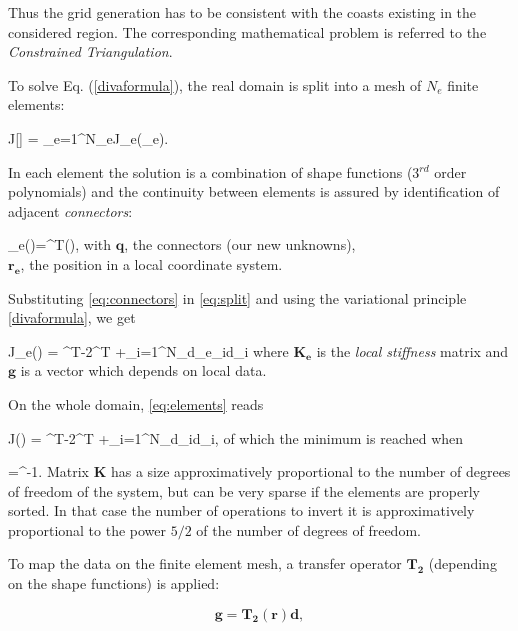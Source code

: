 Thus the grid generation has to be consistent with the coasts existing in the considered region. The corresponding mathematical problem is referred to the \textit{Constrained Triangulation}. %


To solve Eq. (\ref{divaformula}), the real domain is split into a mesh of $N_e$ finite elements:

\be
J[\varphi] = \sum_{e=1}^{N_{e}}J_{e}(\varphi_{e}).
\label{eq:split}
\ee

In each element the solution is a combination of shape functions (3$^{rd}$ order polynomials) and the continuity between elements is assured by identification of adjacent \textit{connectors}:

\be
\varphi_{e}()=^{T}(),
\label{eq:connectors}
\ee
with $\mathbf{q}$, the connectors (our new unknowns),\\
\hphantom{with} $\mathbf{r_e}$, the position in a local coordinate system.

Substituting \eqref{eq:connectors} in \eqref{eq:split} and using the variational principle \eqref{divaformula}, we get

\be
J_{e}() = ^{T}-2^{T} +\sum_{i=1}^{N_{d_{e}}}\mu_{i}d_{i}
\label{eq:elements}
\ee
where $\mathbf{K_e}$ is the \textit{local stiffness} matrix and\\
\hphantom{where} $\mathbf{g}$ is a vector which depends on local data.

On the whole domain, \eqref{eq:elements} reads

\be
J() = ^{T}-2^{T} +\sum_{i=1}^{N_{d}}\mu_{i}d_{i},
\label{eq:domain}
\ee
of which the minimum is reached when

\be
{}=^{-1}.
\label{eq:solution}
\ee
Matrix $\mathbf{K}$ has a size approximatively proportional to the number of degrees of freedom of the system, but can be very sparse if the elements are properly sorted. In that case the number of operations to invert it is approximatively proportional to the power $5/2$ of the number of degrees of freedom.

To map the data on the finite element mesh, a transfer operator $\mathbf{T_{2}}$ (depending on the shape functions) is applied:

\[\mathbf{g}=\mathbf{T_2}(\mathbf{r})\mathbf{d},\]


